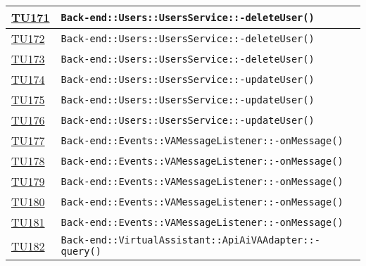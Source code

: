 \begin{longtable}{|>{\centering}m{1cm}|m{12cm}<{\centering}|}
\hyperlink{TU171}{TU171} & \texttt{Back-end::Users::UsersService::-\linebreak deleteUser()}\\ \hline

\hyperlink{TU172}{TU172} & \texttt{Back-end::Users::UsersService::-\linebreak deleteUser()}\\ \hline

\hyperlink{TU173}{TU173} & \texttt{Back-end::Users::UsersService::-\linebreak deleteUser()}\\ \hline

\hyperlink{TU174}{TU174} & \texttt{Back-end::Users::UsersService::-\linebreak updateUser()}\\ \hline

\hyperlink{TU175}{TU175} & \texttt{Back-end::Users::UsersService::-\linebreak updateUser()}\\ \hline

\hyperlink{TU176}{TU176} & \texttt{Back-end::Users::UsersService::-\linebreak updateUser()}\\ \hline

\hyperlink{TU177}{TU177} & \texttt{Back-end::Events::VAMessageListener::-\linebreak onMessage()}\\ \hline

\hyperlink{TU178}{TU178} & \texttt{Back-end::Events::VAMessageListener::-\linebreak onMessage()}\\ \hline

\hyperlink{TU179}{TU179} & \texttt{Back-end::Events::VAMessageListener::-\linebreak onMessage()}\\ \hline

\hyperlink{TU180}{TU180} & \texttt{Back-end::Events::VAMessageListener::-\linebreak onMessage()}\\ \hline

\hyperlink{TU181}{TU181} & \texttt{Back-end::Events::VAMessageListener::-\linebreak onMessage()}\\ \hline

\hyperlink{TU182}{TU182} & \texttt{Back-end::VirtualAssistant::ApiAiVAAdapter::-\linebreak query()}\\ \hline


\end{longtable}
